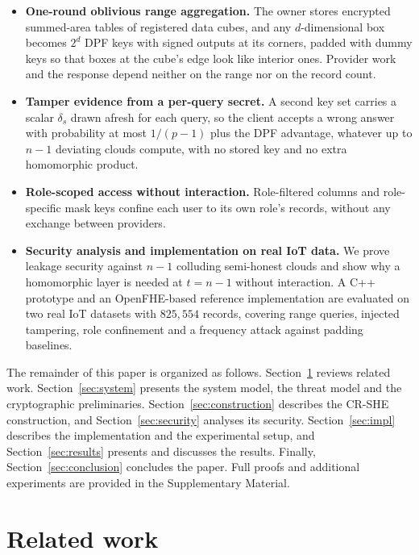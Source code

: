 \begin{itemize}
\item \textbf{One-round oblivious range aggregation.} The owner stores
encrypted summed-area tables of registered data cubes, and any
$d$-dimensional box becomes $2^d$ DPF keys with signed outputs at its corners,
padded with dummy keys so that boxes at the cube's edge look like interior
ones. Provider work and the response depend neither on the range nor on the
record count.
\item \textbf{Tamper evidence from a per-query secret.} A second key set
carries a scalar $\delta_s$ drawn afresh for each query, so the client accepts
a wrong answer with probability at most $1/(p-1)$ plus the DPF advantage,
whatever up to $n-1$ deviating clouds compute, with no stored key and no extra
homomorphic product.
\item \textbf{Role-scoped access without interaction.} Role-filtered columns
and role-specific mask keys confine each user to its own role's records,
without any exchange between providers.
\item \textbf{Security analysis and implementation on real IoT data.} We prove
leakage security against $n-1$ colluding semi-honest clouds and show why a
homomorphic layer is needed at $t=n-1$ without interaction. A C++ prototype and
an OpenFHE-based reference implementation are evaluated on two real IoT
datasets with $825{,}554$ records, covering range queries, injected tampering,
role confinement and a frequency attack against padding baselines.
\end{itemize}

The remainder of this paper is organized as follows.
Section~\ref{sec:related} reviews related work. Section~\ref{sec:system}
presents the system model, the threat model and the cryptographic
preliminaries. Section~\ref{sec:construction} describes the CR-SHE
construction, and Section~\ref{sec:security} analyses its security.
Section~\ref{sec:impl} describes the implementation and the experimental
setup, and Section~\ref{sec:results} presents and discusses the results.
Finally, Section~\ref{sec:conclusion} concludes the paper. Full proofs and
additional experiments are provided in the Supplementary Material.

\section{Related work}
\label{sec:related}

